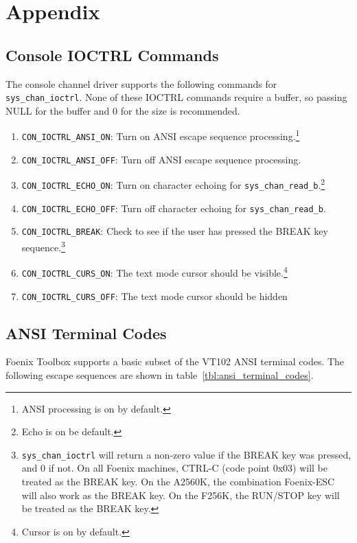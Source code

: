 \chapter{Appendix}

\section{Console IOCTRL Commands}
The console channel driver supports the following commands for \verb+sys_chan_ioctrl+.
None of these IOCTRL commands require a buffer, so passing NULL for the buffer and 0 for the size is recommended.

\begin{enumerate}
	\item \verb+CON_IOCTRL_ANSI_ON+: Turn on ANSI escape sequence processing.\footnote{ANSI processing is on by default.}
	\item \verb+CON_IOCTRL_ANSI_OFF+: Turn off ANSI escape sequence processing.
	\item \verb+CON_IOCTRL_ECHO_ON+: Turn on character echoing for \verb+sys_chan_read_b+.\footnote{Echo is on be default.}
	\item \verb+CON_IOCTRL_ECHO_OFF+: Turn off character echoing for \verb+sys_chan_read_b+.
	\item \verb+CON_IOCTRL_BREAK+: Check to see if the user has pressed the BREAK key sequence.\footnote{{\tt sys\_chan\_ioctrl} will return a non-zero value if the BREAK key was pressed, and 0 if not. On all Foenix machines, CTRL-C (code point 0x03) will be treated as the BREAK key. On the A2560K, the combination Foenix-ESC will also work as the BREAK key. On the F256K, the RUN/STOP key will be treated as the BREAK key.}
	\item \verb+CON_IOCTRL_CURS_ON+: The text mode cursor should be visible.\footnote{Cursor is on by default.}
	\item \verb+CON_IOCTRL_CURS_OFF+: The text mode cursor should be hidden
\end{enumerate}

\section{ANSI Terminal Codes}
Foenix Toolbox supports a basic subset of the VT102 ANSI terminal codes. The following escape sequences are shown in table~\ref{tbl:ansi_terminal_codes}.

